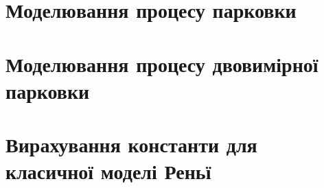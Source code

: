 \begin{appendices}

    	
	
    	
	\section*{Моделювання процесу парковки}
	
	\section*{Моделювання процесу двовимірної парковки}
	
	\section*{Вирахування константи для класичної моделі Реньї}
	
	
\end{appendices}